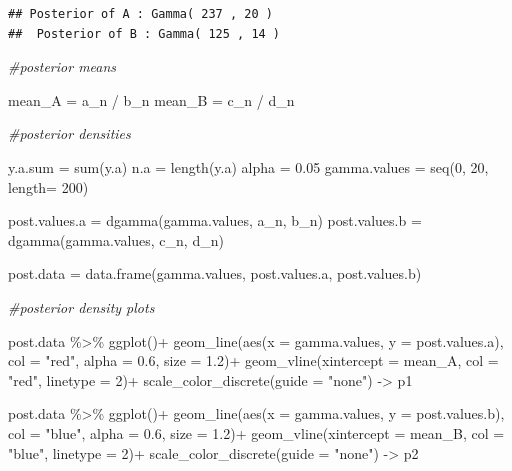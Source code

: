 \documentclass[
  11pt,
]{article}
\newenvironment{Shaded}{\begin{snugshade}}{\end{snugshade}}
\newcommand{\AttributeTok}[1]{\textcolor[rgb]{0.77,0.63,0.00}{#1}}
\newcommand{\CommentTok}[1]{\textcolor[rgb]{0.56,0.35,0.01}{\textit{#1}}}
\newcommand{\DecValTok}[1]{\textcolor[rgb]{0.00,0.00,0.81}{#1}}
\newcommand{\FloatTok}[1]{\textcolor[rgb]{0.00,0.00,0.81}{#1}}
\newcommand{\FunctionTok}[1]{\textcolor[rgb]{0.00,0.00,0.00}{#1}}
\newcommand{\NormalTok}[1]{#1}
\newcommand{\OtherTok}[1]{\textcolor[rgb]{0.56,0.35,0.01}{#1}}
\newcommand{\SpecialCharTok}[1]{\textcolor[rgb]{0.00,0.00,0.00}{#1}}
\newcommand{\StringTok}[1]{\textcolor[rgb]{0.31,0.60,0.02}{#1}}
\begin{document}
\begin{verbatim}
## Posterior of A : Gamma( 237 , 20 ) 
##  Posterior of B : Gamma( 125 , 14 )
\end{verbatim}

\begin{Shaded}
\begin{Highlighting}[]
\CommentTok{\#posterior means}

\NormalTok{mean\_A }\OtherTok{=}\NormalTok{ a\_n }\SpecialCharTok{/}\NormalTok{ b\_n}
\NormalTok{mean\_B }\OtherTok{=}\NormalTok{ c\_n }\SpecialCharTok{/}\NormalTok{ d\_n}

\CommentTok{\#posterior densities}

\NormalTok{y.a.sum }\OtherTok{=} \FunctionTok{sum}\NormalTok{(y.a)}
\NormalTok{n.a }\OtherTok{=} \FunctionTok{length}\NormalTok{(y.a)}
\NormalTok{alpha }\OtherTok{=} \FloatTok{0.05}
\NormalTok{gamma.values }\OtherTok{=} \FunctionTok{seq}\NormalTok{(}\DecValTok{0}\NormalTok{, }\DecValTok{20}\NormalTok{, }\AttributeTok{length=} \DecValTok{200}\NormalTok{)}

\NormalTok{post.values.a }\OtherTok{=} \FunctionTok{dgamma}\NormalTok{(gamma.values, a\_n, b\_n)}
\NormalTok{post.values.b }\OtherTok{=} \FunctionTok{dgamma}\NormalTok{(gamma.values, c\_n, d\_n)}

\NormalTok{post.data }\OtherTok{=} \FunctionTok{data.frame}\NormalTok{(gamma.values, post.values.a, post.values.b)}

\CommentTok{\#posterior density plots}

\NormalTok{post.data }\SpecialCharTok{\%\textgreater{}\%} \FunctionTok{ggplot}\NormalTok{()}\SpecialCharTok{+}
  \FunctionTok{geom\_line}\NormalTok{(}\FunctionTok{aes}\NormalTok{(}\AttributeTok{x =}\NormalTok{ gamma.values, }\AttributeTok{y =}\NormalTok{ post.values.a), }\AttributeTok{col =} \StringTok{"red"}\NormalTok{, }\AttributeTok{alpha =} \FloatTok{0.6}\NormalTok{, }\AttributeTok{size =} \FloatTok{1.2}\NormalTok{)}\SpecialCharTok{+} 
  \FunctionTok{geom\_vline}\NormalTok{(}\AttributeTok{xintercept =}\NormalTok{ mean\_A, }\AttributeTok{col =} \StringTok{"red"}\NormalTok{, }\AttributeTok{linetype =} \DecValTok{2}\NormalTok{)}\SpecialCharTok{+}
  \FunctionTok{scale\_color\_discrete}\NormalTok{(}\AttributeTok{guide =} \StringTok{"none"}\NormalTok{) }\OtherTok{{-}\textgreater{}}\NormalTok{ p1}

\NormalTok{post.data }\SpecialCharTok{\%\textgreater{}\%} \FunctionTok{ggplot}\NormalTok{()}\SpecialCharTok{+}
  \FunctionTok{geom\_line}\NormalTok{(}\FunctionTok{aes}\NormalTok{(}\AttributeTok{x =}\NormalTok{ gamma.values, }\AttributeTok{y =}\NormalTok{ post.values.b), }\AttributeTok{col =} \StringTok{"blue"}\NormalTok{, }\AttributeTok{alpha =} \FloatTok{0.6}\NormalTok{, }\AttributeTok{size =} \FloatTok{1.2}\NormalTok{)}\SpecialCharTok{+}
  \FunctionTok{geom\_vline}\NormalTok{(}\AttributeTok{xintercept =}\NormalTok{ mean\_B, }\AttributeTok{col =} \StringTok{"blue"}\NormalTok{, }\AttributeTok{linetype =} \DecValTok{2}\NormalTok{)}\SpecialCharTok{+}
  \FunctionTok{scale\_color\_discrete}\NormalTok{(}\AttributeTok{guide =} \StringTok{"none"}\NormalTok{) }\OtherTok{{-}\textgreater{}}\NormalTok{ p2}


\end{Highlighting}
\end{Shaded}
\end{document}
